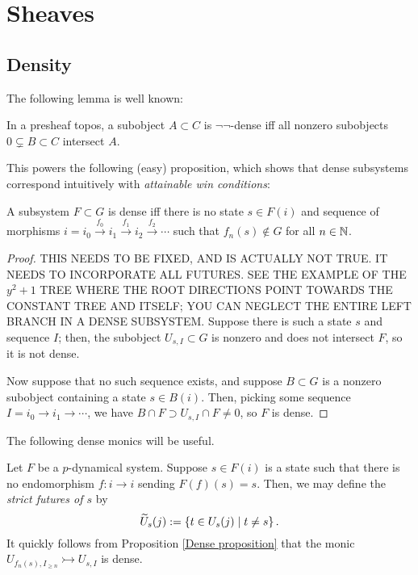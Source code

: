 \documentclass{amsart}
\begin{document}
\section{Sheaves}\label{Sheaves section}
\subsection{Density}
The following lemma is well known:
\begin{lemma}
  In a presheaf topos, a subobject $A \subset C$ is $\neg\neg$-dense iff all nonzero subobjects $0 \subsetneq B \subset C$ intersect $A$.
\end{lemma}
This powers the following (easy) proposition, which shows that dense subsystems correspond intuitively with \emph{attainable win conditions}:
\begin{proposition}\label{Dense proposition}
  A subsystem $F \subset G$ is dense iff there is no state $s \in F(i)$ and sequence of morphisms $i = i_0 \xrightarrow{f_0} i_1 \xrightarrow{f_1} i_2 \xrightarrow{f_2} \cdots$ such that $f_n(s) \not \in G$ for all $n \in \mathbb{N}$. 
\end{proposition}
\begin{proof}
  {\color{magenta} THIS NEEDS TO BE FIXED, AND IS ACTUALLY NOT TRUE. IT NEEDS TO INCORPORATE ALL FUTURES. SEE THE EXAMPLE OF THE $y^2 + 1$ TREE WHERE THE ROOT DIRECTIONS POINT TOWARDS THE CONSTANT TREE AND ITSELF; YOU CAN NEGLECT THE ENTIRE LEFT BRANCH IN A DENSE SUBSYSTEM.}
  Suppose there is such a state $s$ and sequence $I$;
  then, the subobject $U_{s,I} \subset G$ is nonzero and does not intersect $F$, so it is not dense.

  Now suppose that no such sequence exists, and suppose $B \subset G$ is a nonzero subobject containing a state $s \in B(i)$.
  Then, picking some sequence $I = i_0 \rightarrow i_1 \rightarrow \cdots$, we have $B \cap F \supset U_{s,I} \cap F \neq 0$, so $F$ is dense.
\end{proof}

The following dense monics will be useful.
\begin{example}
  Let $F$ be a $p$-dynamical system.
  Suppose $s \in F(i)$ is a state such that there is no endomorphism $f:i \rightarrow i$ sending $F(f)(s) = s$.
  Then, we may define the \emph{strict futures of $s$} by
  \[
    \widetilde U_s(j) := \left\{ t \in U_s(j) \mid t \neq s \right\}.
  \]
  It quickly follows from Proposition \ref{Dense proposition} that the monic $U_{f_n(s),I_{\geq n}} \rightarrowtail U_{s,I}$ is dense.
\end{example}
\end{document}
